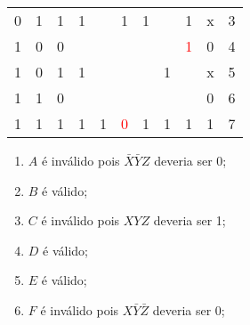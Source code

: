 \documentclass{article}
\begin{document}
\begin{resolution}
\begin{table}[H]
\begin{tabular}{ccc|cccccc|c|c}
                        0&1&1& 1 &   & 1 & 1 &   & 1 & x & 3\\
                        1&0&0&   &   &   &   &   & \textcolor{red}{1} & 0 & 4\\
                        1&0&1& 1 &   &   &   & 1 &   & x & 5\\
                        1&1&0&   &   &   &   &   &   & 0 & 6\\
                        1&1&1& 1 & 1 & \textcolor{red}{0} & 1 & 1 & 1 & 1 & 7\\\hline
                    \end{tabular}
                \end{table}\noindent
                \begin{enumerate}[noitemsep]
                    \item $A$ é inválido pois $\bar{X}\bar{Y}Z$ deveria ser 0;
                    \item $B$ é válido;
                    \item $C$ é inválido pois $XYZ$ deveria ser 1;
                    \item $D$ é válido;
                    \item $E$ é válido;
                    \item $F$ é inválido pois $X\bar{Y}\bar{Z}$ deveria ser 0;
                \end{enumerate}
            \end{resolution}
\newpage
\end{document}
